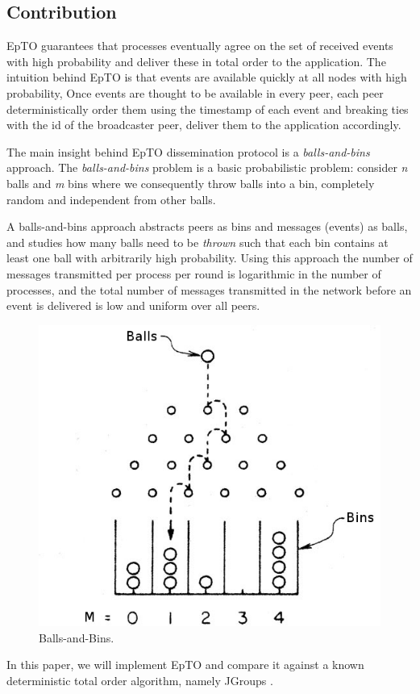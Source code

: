 \documentclass[10pt,conference,a4paper]{IEEEtran}
\begin{document}
\subsection{Contribution}
EpTO guarantees that processes eventually agree on the set of received events with high probability and deliver these in total order to the application. The intuition behind EpTO is that events are available quickly at all nodes with high probability,
Once events are thought to be available in every peer, each peer deterministically order them using the timestamp of each event and breaking ties with the id of the broadcaster peer, deliver them to the application accordingly.
\par
The main insight behind EpTO dissemination protocol is a \textit{balls-and-bins} approach. The \textit{balls-and-bins} problem is a basic probabilistic problem: consider \textit{n} balls and \textit{m} bins where we consequently throw balls into a bin, completely random and independent from other balls.
\par
A balls-and-bins approach abstracts peers as bins and messages (events) as balls, and studies how many balls need to be \textit{thrown} such that each bin contains at least one ball with arbitrarily high probability. Using this approach the number of messages transmitted per process per round is logarithmic in the number of processes, and the total number of messages
transmitted in the network before an event is delivered is low and uniform over all peers.

\begin{figure}
\includegraphics[width=\linewidth]{figures/BnB.jpeg}
\caption{Balls-and-Bins\protect\footnotemark{}.}
\label{fig:balls-and-bins}
\end{figure}
\par
In this paper, we will implement EpTO and compare it against a known deterministic total order algorithm, namely JGroups \autocite{jgroups}.
\end{document}
